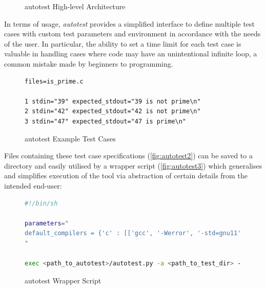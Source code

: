 \documentclass[hidelinks, 12pt]{extreport}
\begin{document}
\begin{figure}[h]
	\centering
	\caption{autotest High-level Architecture}
	\label{fig:autotest1}
\end{figure}

In terms of usage, \textit{autotest} provides a simplified interface to define multiple test cases with custom test parameters and environment in accordance with the needs of the user. In particular, the ability to set a time limit for each test case is valuable in handling cases where code may have an unintentional infinite loop, a common mistake made by beginners to programming.

\begin{figure}[h]
	\centering
	\begin{lstlisting}[linewidth=\linewidth]
files=is_prime.c
		
1 stdin="39" expected_stdout="39 is not prime\n"
2 stdin="42" expected_stdout="42 is not prime\n"
3 stdin="47" expected_stdout="47 is prime\n"
	\end{lstlisting}
	\caption{autotest Example Test Cases}
	\label{fig:autotest2}
\end{figure}

Files containing these test case specifications (\autoref{fig:autotest2}) can be saved to a directory and easily utilised by a wrapper script (\autoref{fig:autotest3}) which generalises and simplifies execution of the tool via abstraction of certain details from the intended end-user:

\begin{figure}[h]
	\centering
	\begin{lstlisting}[language=bash, breaklines=true, linewidth=\linewidth]
#!/bin/sh

parameters="
default_compilers = {'c' : [['gcc', '-Werror', '-std=gnu11', '-g', '-lm']]}
"

exec <path_to_autotest>/autotest.py -a <path_to_test_dir> --parameters "$parameters" "$@"
	\end{lstlisting}
	\caption{autotest Wrapper Script}
	\label{fig:autotest3}
\end{figure}
\end{document}
